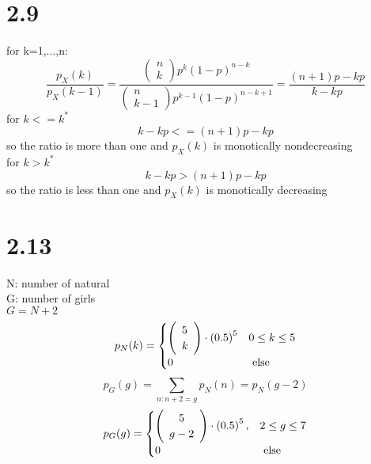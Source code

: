 \documentclass{article}
\begin{document}
\section*{2.9}
for k=1,...,n: 
\begin{equation*}
\frac{p_{X}(k)}{p_{X}(k-1)}=\frac{\left(\begin{array}{c}n \\ k\end{array}\right) p^{k}(1-p)^{n-k}}{\left(\begin{array}{c}n \\ k-1\end{array}\right) p^{k-1}(1-p)^{n-k+1}}=\frac{(n+1)p-kp}{k-kp}
\end{equation*}
for $k<=k^*$
\begin{equation*}
 k-kp<= (n+1)p-kp 
\end{equation*}
so the ratio is more than one and $p_X(k)$ is monotically nondecreasing\\
for $k>k^*$
\begin{equation*}
 k-kp> (n+1)p-kp 
\end{equation*}
so the ratio is less than one and  $p_X(k)$ is monotically decreasing



\section*{2.13}
N: number of natural\\
G: number of girls\\
$G=N+2$\\
\begin{equation*}
p_{N}(k)= \begin{cases}\left(\begin{array}{l}
5 \\
k
\end{array}\right) \cdot\left(0.5\right)^{5} & \text  0 \leq k \leq 5 \\
0 & \text { else }\end{cases}
\end{equation*}
$$
p_{G}(g)=\sum_{n: n+2=g} p_{N}(n)=p_{N}(g-2)
$$
$$
p_{G}(g)= \begin{cases}\left(\begin{array}{c}
5 \\
g-2
\end{array}\right) \cdot\left(0.5\right)^{5}, & \text  2 \leq g \leq 7 \\
0 & \text { else }\end{cases}
$$
\end{document}
